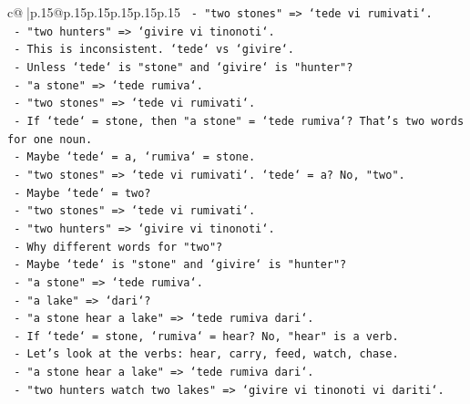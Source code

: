 \documentclass{article}
\begin{document}
{\begin{supertabular}{c@{$\;$}|p{.15\linewidth}@{}p{.15\linewidth}p{.15\linewidth}p{.15\linewidth}p{.15\linewidth}p{.15\linewidth}}
{{{\texttt{                             {-} "two stones" => `tede vi rumivati`.} \\
\texttt{                             {-} "two hunters" => `givire vi tinonoti`.} \\
\texttt{                             {-} This is inconsistent. `tede` vs `givire`.} \\
\texttt{                             {-} Unless `tede` is "stone" and `givire` is "hunter"?} \\
\texttt{                             {-} "a stone" => `tede rumiva`.} \\
\texttt{                             {-} "two stones" => `tede vi rumivati`.} \\
\texttt{                             {-} If `tede` = stone, then "a stone" = `tede rumiva`? That's two words for one noun.} \\
\texttt{                             {-} Maybe `tede` = a, `rumiva` = stone.} \\
\texttt{                             {-} "two stones" => `tede vi rumivati`. `tede` = a? No, "two".} \\
\texttt{                             {-} Maybe `tede` = two?} \\
\texttt{                             {-} "two stones" => `tede vi rumivati`.} \\
\texttt{                             {-} "two hunters" => `givire vi tinonoti`.} \\
\texttt{                             {-} Why different words for "two"?} \\
\texttt{                             {-} Maybe `tede` is "stone" and `givire` is "hunter"?} \\
\texttt{                             {-} "a stone" => `tede rumiva`.} \\
\texttt{                             {-} "a lake" => `dari`?} \\
\texttt{                             {-} "a stone hear a lake" => `tede rumiva dari`.} \\
\texttt{                             {-} If `tede` = stone, `rumiva` = hear? No, "hear" is a verb.} \\
\texttt{                             {-} Let's look at the verbs: hear, carry, feed, watch, chase.} \\
\texttt{                             {-} "a stone hear a lake" => `tede rumiva dari`.} \\
\texttt{                             {-} "two hunters watch two lakes" => `givire vi tinonoti vi dariti`.} \\
}}}
\end{supertabular}}
\end{document}
